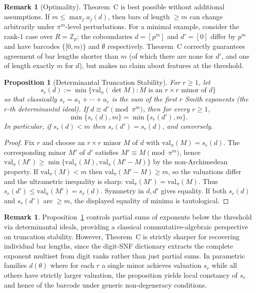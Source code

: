 \documentclass[11pt]{amsart}
\theoremstyle{plain}
\newtheorem{proposition}[theorem]{Proposition}
\theoremstyle{definition}
\newtheorem{remark}[theorem]{Remark}
\newcommand{\Zp}{\mathbb{Z}_p}                        %
\newcommand{\valpi}{\mathrm{val}_{\unif}}                   %
\newcommand{\Ring}{R}                          %
\newcommand{\unif}{\pi}                        %
\newcommand{\coboundary}{d}                           %
\begin{document}
\begin{remark}[Optimality]
\label{rem:stability-optimal}
Theorem~C is best possible without additional assumptions. If $m \le \max_j a_j(\coboundary)$, then bars of length $\ge m$ can change arbitrarily under $\unif^m$-level perturbations. For a minimal example, consider the rank-1 case over $\Ring = \Zp$: the coboundaries $\coboundary = [p^m]$ and $\coboundary' = [0]$ differ by $p^m$ and have barcodes $\{[0,m)\}$ and $\emptyset$ respectively. Theorem~C correctly guarantees agreement of bar lengths shorter than $m$ (of which there are none for $\coboundary'$, and one of length exactly $m$ for $\coboundary$), but makes no claim about features at the threshold.
\end{remark}

\begin{proposition}[Determinantal Truncation Stability]
\label{prop:determinantal-truncation}
For $r \ge 1$, let 
\[
s_r(\coboundary) := \min\{\valpi(\det M) : M \text{ is an } r \times r \text{ minor of } \coboundary\}
\]
so that classically $s_r = a_1 + \cdots + a_r$ is the sum of the first $r$ Smith exponents (the $r$-th determinantal ideal). If $\coboundary \equiv \coboundary' \pmod{\unif^m}$, then for every $r \ge 1$,
\[
\min\{s_r(\coboundary), m\} = \min\{s_r(\coboundary'), m\}.
\]
In particular, if $s_r(\coboundary) < m$ then $s_r(\coboundary') = s_r(\coboundary)$, and conversely.
\end{proposition}

\begin{proof}
Fix $r$ and choose an $r \times r$ minor $M$ of $\coboundary$ with $\valpi(M) = s_r(\coboundary)$. The corresponding minor $M'$ of $\coboundary'$ satisfies $M' \equiv M \pmod{\unif^m}$, hence $\valpi(M') \ge \min\{\valpi(M), \valpi(M'-M)\}$ by the non-Archimedean property. If $\valpi(M) < m$ then $\valpi(M'-M) \ge m$, so the valuations differ and the ultrametric inequality is sharp: $\valpi(M') = \valpi(M)$. Thus $s_r(\coboundary') \le \valpi(M') = s_r(\coboundary)$. Symmetry in $\coboundary, \coboundary'$ gives equality. If both $s_r(\coboundary)$ and $s_r(\coboundary')$ are $\ge m$, the displayed equality of minima is tautological.
\end{proof}

\begin{remark}
Proposition~\ref{prop:determinantal-truncation} controls partial sums of exponents below the threshold via determinantal ideals, providing a classical commutative-algebraic perspective on truncation stability. However, Theorem~C is strictly sharper for recovering individual bar lengths, since the digit-SNF dictionary extracts the complete exponent multiset from digit ranks rather than just partial sums. In parametric families $\coboundary(\theta)$ where for each $r$ a single minor achieves valuation $s_r$ while all others have strictly larger valuation, the proposition yields local constancy of $s_r$ and hence of the barcode under generic non-degeneracy conditions.
\end{remark}
\end{document}
